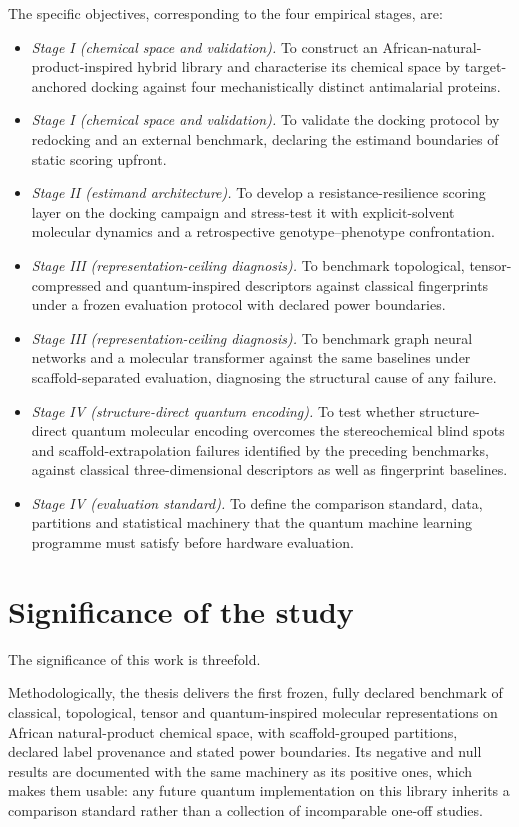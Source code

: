 The specific objectives, corresponding to the four empirical stages, are:

\begin{itemize}
	\item \emph{Stage I (chemical space and validation).} To construct an African-natural-product-inspired hybrid library and characterise its chemical space by target-anchored docking against four mechanistically distinct antimalarial proteins.
	\item \emph{Stage I (chemical space and validation).} To validate the docking protocol by redocking and an external benchmark, declaring the estimand boundaries of static scoring upfront.
	\item \emph{Stage II (estimand architecture).} To develop a resistance-resilience scoring layer on the docking campaign and stress-test it with explicit-solvent molecular dynamics and a retrospective genotype--phenotype confrontation.
	\item \emph{Stage III (representation-ceiling diagnosis).} To benchmark topological, tensor-compressed and quantum-inspired descriptors against classical fingerprints under a frozen evaluation protocol with declared power boundaries.
	\item \emph{Stage III (representation-ceiling diagnosis).} To benchmark graph neural networks and a molecular transformer against the same baselines under scaffold-separated evaluation, diagnosing the structural cause of any failure.
	\item \emph{Stage IV (structure-direct quantum encoding).} To test whether structure-direct quantum molecular encoding overcomes the stereochemical blind spots and scaffold-extrapolation failures identified by the preceding benchmarks, against classical three-dimensional descriptors as well as fingerprint baselines.
	\item \emph{Stage IV (evaluation standard).} To define the comparison standard, data, partitions and statistical machinery that the quantum machine learning programme must satisfy before hardware evaluation.
\end{itemize}

\section*{Significance of the study}

The significance of this work is threefold.

Methodologically, the thesis delivers the first frozen, fully declared benchmark of classical, topological, tensor and quantum-inspired molecular representations on African natural-product chemical space, with scaffold-grouped partitions, declared label provenance and stated power boundaries. Its negative and null results are documented with the same machinery as its positive ones, which makes them usable: any future quantum implementation on this library inherits a comparison standard rather than a collection of incomparable one-off studies.

